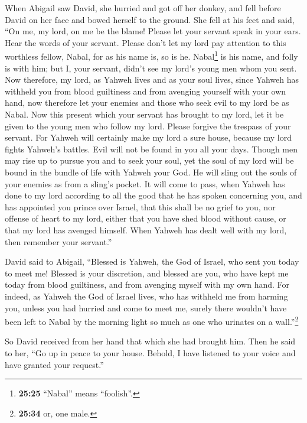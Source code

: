  When Abigail saw David, she hurried and got off her
donkey, and fell before David on her face and bowed herself to the
ground.  She fell at his feet and said, ``On me, my lord,
on me be the blame! Please let your servant speak in your ears. Hear the
words of your servant.  Please don't let my lord pay
attention to this worthless fellow, Nabal, for as his name is, so is he.
Nabal\footnote{\textbf{25:25} ``Nabal'' means ``foolish''.} is his name,
and folly is with him; but I, your servant, didn't see my lord's young
men whom you sent.  Now therefore, my lord, as Yahweh
lives and as your soul lives, since Yahweh has withheld you from blood
guiltiness and from avenging yourself with your own hand, now therefore
let your enemies and those who seek evil to my lord be as Nabal.
 Now this present which your servant has brought to my
lord, let it be given to the young men who follow my lord.
 Please forgive the trespass of your servant. For Yahweh
will certainly make my lord a sure house, because my lord fights
Yahweh's battles. Evil will not be found in you all your days.
 Though men may rise up to pursue you and to seek your
soul, yet the soul of my lord will be bound in the bundle of life with
Yahweh your God. He will sling out the souls of your enemies as from a
sling's pocket.  It will come to pass, when Yahweh has
done to my lord according to all the good that he has spoken concerning
you, and has appointed you prince over Israel,  that this
shall be no grief to you, nor offense of heart to my lord, either that
you have shed blood without cause, or that my lord has avenged himself.
When Yahweh has dealt well with my lord, then remember your servant.''

 David said to Abigail, ``Blessed is Yahweh, the God of
Israel, who sent you today to meet me!  Blessed is your
discretion, and blessed are you, who have kept me today from blood
guiltiness, and from avenging myself with my own hand. 
For indeed, as Yahweh the God of Israel lives, who has withheld me from
harming you, unless you had hurried and come to meet me, surely there
wouldn't have been left to Nabal by the morning light so much as one who
urinates on a wall.''\footnote{\textbf{25:34} or, one male.}

 So David received from her hand that which she had
brought him. Then he said to her, ``Go up in peace to your house.
Behold, I have listened to your voice and have granted your request.''

